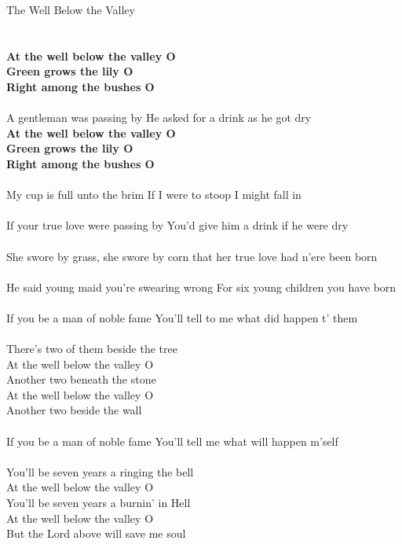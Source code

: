 \documentclass[letterpaper,9pt]{article}
\begin{document}
\newpage
{}
\huge
The Well Below the Valley\\
\\
\noindent
\Large
\\\textbf{At the well below the valley O
\\Green grows the lily O
\\Right among the bushes O}
\\
\\A gentleman was passing by He asked for a drink as he got dry
\\\textbf{At the well below the valley O
\\Green grows the lily O
\\Right among the bushes O}
\\
\\My cup is full unto the brim If I were to stoop I might fall in
\\
\\If your true love were passing by You'd give him a drink if he were dry
\\
\\She swore by grass, she swore by corn that her true love had n'ere been born
\\
\\He said young maid you're swearing wrong For six young children you have born
\\
\\If you be a man of noble fame You'll tell to me what did happen t' them
\\
\\There's two of them beside the tree
\\At the well below the valley O
\\Another two beneath the stone
\\At the well below the valley O
\\Another two beside the wall
\\
\\If you be a man of noble fame You'll tell me what will happen m'self
\\
\\You'll be seven years a ringing the bell
\\At the well below the valley O
\\You'll be seven years a burnin' in Hell
\\At the well below the valley O
\\But the Lord above will save me soul
\end{document}
